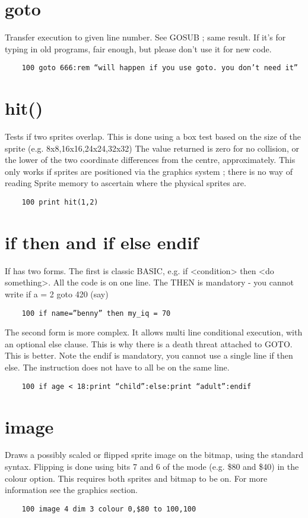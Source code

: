 \section*{goto}
Transfer execution to given line number. See GOSUB ; same result. If it's for typing in old programs, fair enough, but please don't use it for new code.
\example{}
\begin{verbatim}
	100 goto 666:rem “will happen if you use goto. you don’t need it”
\end{verbatim}

\section*{hit()}
Tests if two sprites overlap. This is done using a box test based on the size of the sprite (e.g. 8x8,16x16,24x24,32x32)
The value returned is zero for no collision, or the lower of the two coordinate differences from the centre, approximately.
This only works if sprites are positioned via the graphics system ; there is no way of reading Sprite memory to ascertain where the physical sprites are.
\example{}
\begin{verbatim}
	100 print hit(1,2)
\end{verbatim}

\section*{if then and if else endif}
If has two forms. The first is classic BASIC, e.g. if <condition> then <do something>. All the code is on one line. The THEN is mandatory - you cannot write if a = 2 goto 420 (say)
\example{}
\begin{verbatim}
	100 if name=”benny” then my_iq = 70
\end{verbatim}
The second form is more complex. It allows multi line conditional execution, with an optional else clause. This is why there is a death threat attached to GOTO. This is better.  Note the endif is mandatory, you cannot use a single line if then else. The instruction does not have to all be on the same line.
\example{}
\begin{verbatim}
	100 if age < 18:print “child”:else:print “adult”:endif
\end{verbatim}

\section*{image}
Draws a possibly scaled or flipped sprite image on the bitmap, using the standard syntax. Flipping is done using bits 7 and 6 of the mode (e.g. \$80 and \$40) in the colour option. This requires both sprites and bitmap to be on. For more information see the graphics section.
\example{}
\begin{verbatim}
	100 image 4 dim 3 colour 0,$80 to 100,100
\end{verbatim}

